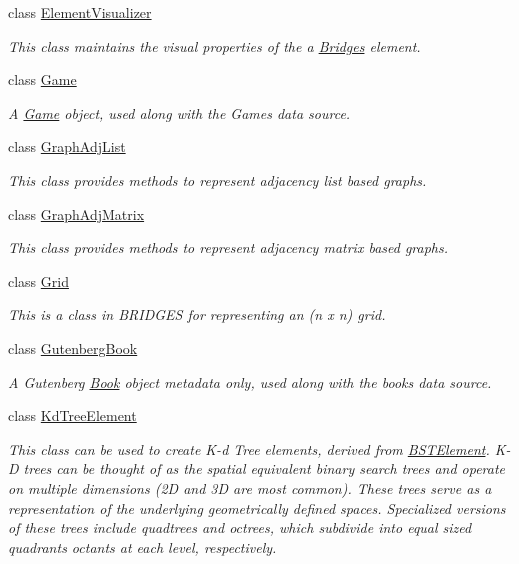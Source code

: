 \begin{DoxyCompactItemize}
class \mbox{\hyperlink{classbridges_1_1_element_visualizer}{Element\+Visualizer}}
\begin{DoxyCompactList}\small\item\em This class maintains the visual properties of the a \mbox{\hyperlink{classbridges_1_1_bridges}{Bridges}} element. \end{DoxyCompactList}\item 
class \mbox{\hyperlink{classbridges_1_1_game}{Game}}
\begin{DoxyCompactList}\small\item\em A \mbox{\hyperlink{classbridges_1_1_game}{Game}} object, used along with the Games data source. \end{DoxyCompactList}\item 
class \mbox{\hyperlink{classbridges_1_1_graph_adj_list}{Graph\+Adj\+List}}
\begin{DoxyCompactList}\small\item\em This class provides methods to represent adjacency list based graphs. \end{DoxyCompactList}\item 
class \mbox{\hyperlink{classbridges_1_1_graph_adj_matrix}{Graph\+Adj\+Matrix}}
\begin{DoxyCompactList}\small\item\em This class provides methods to represent adjacency matrix based graphs. \end{DoxyCompactList}\item 
class \mbox{\hyperlink{classbridges_1_1_grid}{Grid}}
\begin{DoxyCompactList}\small\item\em This is a class in B\+R\+I\+D\+G\+ES for representing an (n x n) grid. \end{DoxyCompactList}\item 
class \mbox{\hyperlink{classbridges_1_1_gutenberg_book}{Gutenberg\+Book}}
\begin{DoxyCompactList}\small\item\em A Gutenberg \mbox{\hyperlink{classbridges_1_1_book}{Book}} object metadata only, used along with the books data source. \end{DoxyCompactList}\item 
class \mbox{\hyperlink{classbridges_1_1_kd_tree_element}{Kd\+Tree\+Element}}
\begin{DoxyCompactList}\small\item\em This class can be used to create K-\/d Tree elements, derived from \mbox{\hyperlink{classbridges_1_1_b_s_t_element}{B\+S\+T\+Element}}. K-\/D trees can be thought of as the spatial equivalent binary search trees and operate on multiple dimensions (2D and 3D are most common). These trees serve as a representation of the underlying geometrically defined spaces. Specialized versions of these trees include quadtrees and octrees, which subdivide into equal sized quadrants octants at each level, respectively. \end{DoxyCompactList}\item 

\end{DoxyCompactItemize}

